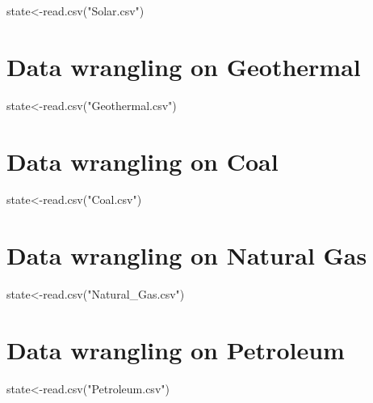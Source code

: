 \documentclass[
]{article}
\newenvironment{Shaded}{\begin{snugshade}}{\end{snugshade}}
\newcommand{\FunctionTok}[1]{\textcolor[rgb]{0.00,0.00,0.00}{#1}}
\newcommand{\NormalTok}[1]{#1}
\newcommand{\OtherTok}[1]{\textcolor[rgb]{0.56,0.35,0.01}{#1}}
\newcommand{\StringTok}[1]{\textcolor[rgb]{0.31,0.60,0.02}{#1}}
\begin{document}
\begin{Shaded}
\begin{Highlighting}[]
\NormalTok{state}\OtherTok{\textless{}{-}}\FunctionTok{read.csv}\NormalTok{(}\StringTok{"Solar.csv"}\NormalTok{)}
\end{Highlighting}
\end{Shaded}

\hypertarget{data-wrangling-on-geothermal}{%
\section{Data wrangling on
Geothermal}\label{data-wrangling-on-geothermal}}

\begin{Shaded}
\begin{Highlighting}[]
\NormalTok{state}\OtherTok{\textless{}{-}}\FunctionTok{read.csv}\NormalTok{(}\StringTok{"Geothermal.csv"}\NormalTok{)}
\end{Highlighting}
\end{Shaded}

\hypertarget{data-wrangling-on-coal}{%
\section{Data wrangling on Coal}\label{data-wrangling-on-coal}}

\begin{Shaded}
\begin{Highlighting}[]
\NormalTok{state}\OtherTok{\textless{}{-}}\FunctionTok{read.csv}\NormalTok{(}\StringTok{"Coal.csv"}\NormalTok{)}
\end{Highlighting}
\end{Shaded}

\hypertarget{data-wrangling-on-natural-gas}{%
\section{Data wrangling on Natural
Gas}\label{data-wrangling-on-natural-gas}}

\begin{Shaded}
\begin{Highlighting}[]
\NormalTok{state}\OtherTok{\textless{}{-}}\FunctionTok{read.csv}\NormalTok{(}\StringTok{"Natural\_Gas.csv"}\NormalTok{)}
\end{Highlighting}
\end{Shaded}

\hypertarget{data-wrangling-on-petroleum}{%
\section{Data wrangling on
Petroleum}\label{data-wrangling-on-petroleum}}

\begin{Shaded}
\begin{Highlighting}[]
\NormalTok{state}\OtherTok{\textless{}{-}}\FunctionTok{read.csv}\NormalTok{(}\StringTok{"Petroleum.csv"}\NormalTok{)}
\end{Highlighting}
\end{Shaded}
\end{document}
